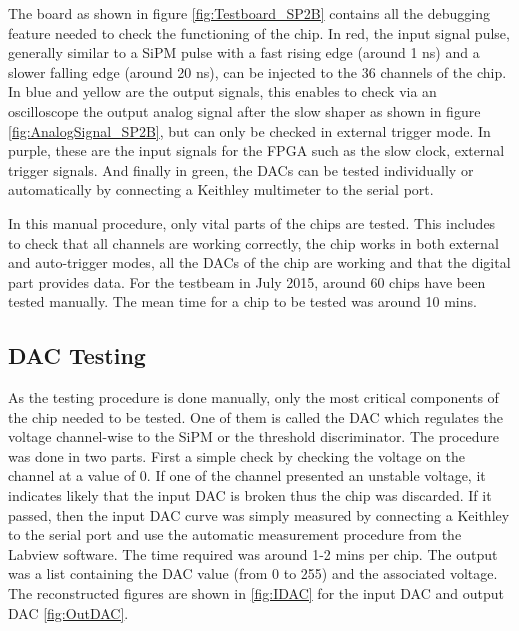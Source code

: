The board as shown in figure \ref{fig:Testboard_SP2B} contains all the debugging feature needed to check the functioning of the chip. In red, the input signal pulse, generally similar to a SiPM pulse with a fast rising edge (around 1 ns) and a slower falling edge (around 20 ns), can be injected to the 36 channels of the chip. In blue and yellow are the output signals, this enables to check via an oscilloscope the output analog signal after the slow shaper as shown in figure \ref{fig:AnalogSignal_SP2B}, but can only be checked in external trigger mode. In purple, these are the input signals for the FPGA such as the slow clock, external trigger signals. And finally in green, the DACs can be tested individually or automatically by connecting a Keithley multimeter to the serial port.

In this manual procedure, only vital parts of the chips are tested. This includes to check that all channels are working correctly, the chip works in both external and auto-trigger modes, all the DACs of the chip are working and that the digital part provides data. For the testbeam in July 2015, around 60 chips have been tested manually. The mean time for a chip to be tested was around 10 mins.

\subsection{DAC Testing}

As the testing procedure is done manually, only the most critical components of the chip needed to be tested. One of them is called the DAC which regulates the voltage channel-wise to the SiPM or the threshold discriminator. The procedure was done in two parts. First a simple check by checking the voltage on the channel at a value of 0. If one of the channel presented an unstable voltage, it indicates likely that the input DAC is broken thus the chip was discarded. If it passed, then the input DAC curve was simply measured by connecting a Keithley to the serial port and use the automatic measurement procedure from the Labview software. The time required was around 1-2 mins per chip. The output was a list containing the DAC value (from 0 to 255) and the associated voltage. The reconstructed figures are shown in \ref{fig:IDAC} for the input DAC and output DAC \ref{fig:OutDAC}.

